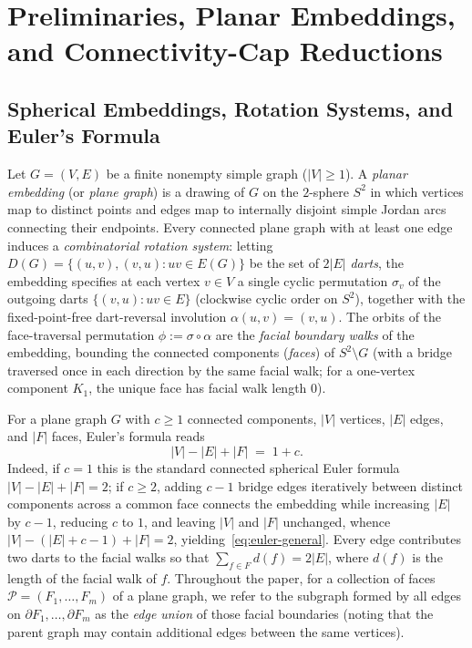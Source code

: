 \documentclass[11pt,reqno]{amsart}
\theoremstyle{plain}
\theoremstyle{definition}
\theoremstyle{remark}
\DeclareRobustCommand{\_}{\ifmmode\text{\textunderscore}\else\textunderscore\allowbreak\fi}
\begin{document}
\section{Preliminaries, Planar Embeddings, and Connectivity-Cap Reductions}\label{sec:prelim}

\subsection{Spherical Embeddings, Rotation Systems, and Euler's Formula}\label{subsec:euler}

Let $G = (V, E)$ be a finite nonempty simple graph ($|V| \ge 1$). A \emph{planar embedding} (or \emph{plane graph}) is a drawing of $G$ on the $2$-sphere $S^2$ in which vertices map to distinct points and edges map to internally disjoint simple Jordan arcs connecting their endpoints. Every connected plane graph with at least one edge induces a \emph{combinatorial rotation system}: letting $D(G) = \{(u,v), (v,u) : uv \in E(G)\}$ be the set of $2|E|$ \emph{darts}, the embedding specifies at each vertex $v \in V$ a single cyclic permutation $\sigma_v$ of the outgoing darts $\{(v,u) : uv \in E\}$ (clockwise cyclic order on $S^2$), together with the fixed-point-free dart-reversal involution $\alpha(u,v) = (v,u)$. The orbits of the face-traversal permutation $\phi := \sigma \circ \alpha$ are the \emph{facial boundary walks} of the embedding, bounding the connected components (\emph{faces}) of $S^2 \setminus G$ (with a bridge traversed once in each direction by the same facial walk; for a one-vertex component $K_1$, the unique face has facial walk length $0$).

For a plane graph $G$ with $c \ge 1$ connected components, $|V|$ vertices, $|E|$ edges, and $|F|$ faces, Euler's formula reads
\begin{equation}\label{eq:euler-general}
  |V| - |E| + |F| \;=\; 1 + c.
\end{equation}
Indeed, if $c = 1$ this is the standard connected spherical Euler formula $|V| - |E| + |F| = 2$; if $c \ge 2$, adding $c - 1$ bridge edges iteratively between distinct components across a common face connects the embedding while increasing $|E|$ by $c - 1$, reducing $c$ to $1$, and leaving $|V|$ and $|F|$ unchanged, whence $|V| - (|E| + c - 1) + |F| = 2$, yielding~\eqref{eq:euler-general}. Every edge contributes two darts to the facial walks so that $\sum_{f \in F} d(f) = 2|E|$, where $d(f)$ is the length of the facial walk of $f$. Throughout the paper, for a collection of faces $\mathcal{P} = (F_1, \dots, F_m)$ of a plane graph, we refer to the subgraph formed by all edges on $\partial F_1, \dots, \partial F_m$ as the \emph{edge union} of those facial boundaries (noting that the parent graph may contain additional edges between the same vertices).
\end{document}
